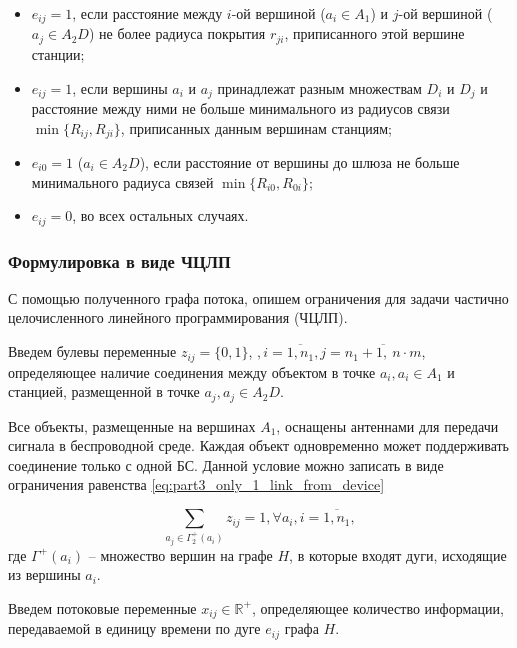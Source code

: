 \begin{itemize}
    \item $e_{ij} = 1$, если расстояние между $i$-ой вершиной ($a_i \in A_1$) и $j$-ой вершиной ($a_j \in A_2D$) не более радиуса покрытия $r_{ji}$, приписанного этой вершине станции;
    \item $e_{ij} = 1$, если вершины $a_i$ и $a_j$ принадлежат разным множествам $D_i$ и $D_j$ и расстояние между ними не больше минимального из радиусов связи $\min\{R_{ij}, R_{ji}\}$, приписанных данным вершинам станциям;
    \item $e_{i0} = 1$ ($a_i \in A_2D$), если расстояние от вершины до шлюза не больше минимального радиуса связей $\min\{R_{i0}, R_{0i}\}$;
    \item $e_{ij} = 0$, во всех остальных случаях.
\end{itemize}

\subsubsection{Формулировка в виде ЧЦЛП}

С помощью полученного графа потока, опишем ограничения для задачи частично целочисленного линейного программирования (ЧЦЛП).

Введем булевы переменные $z_{ij} = \{0, 1\}$, $, i = \overline{1,n_1}, j = \overline{n_1+1, \ n \cdot m}$, определяющее наличие соединения между объектом в точке $a_i, a_i \in A_1$  и станцией, размещенной в точке $a_j, a_j \in A_2D$.


Все объекты, размещенные на вершинах $A_1$, оснащены антеннами для передачи сигнала в беспроводной среде. Каждая объект одновременно может поддерживать соединение только с одной БС. Данной условие можно записать в виде ограничения равенства \cref{eq:part3_only_1_link_from_device}


\begin{equation}\label{eq:part3_only_1_link_from_device}
    \sum_{a_j \in \Gamma_2^+(a_i)} z_{ij} = 1, \forall a_i, i =\overline{1, n_1},
\end{equation} 
где $\Gamma^+(a_i)$ -- множество вершин на графе $H$, в которые входят дуги, исходящие из вершины $a_i$.

Введем потоковые переменные $x_{ij} \in \mathbb{R}^+$, определяющее количество информации, передаваемой в единицу времени по дуге $e_{ij}$ графа $H$.

